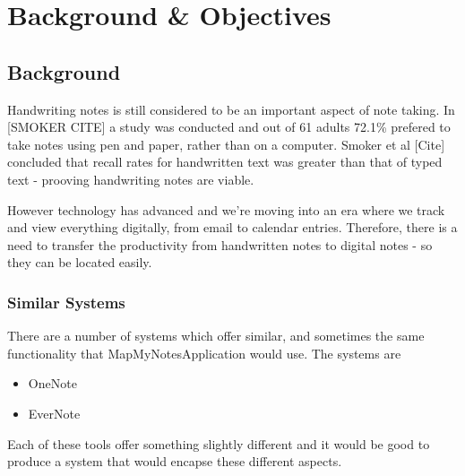 \chapter{Background \& Objectives}






\section{Background}
Handwriting notes is still considered to be an important aspect of note taking. In [SMOKER CITE] a study was conducted and out of 61 adults 72.1\% prefered to take notes using pen and paper, rather than on a computer. Smoker et al [Cite]  concluded that recall rates for handwritten text was greater than that of typed text - prooving handwriting notes are viable.

However technology has advanced and we're moving into an era where we track and view everything digitally, from email to calendar entries. Therefore, there is a need to transfer the productivity from handwritten notes to digital notes - so they can be located easily.



\subsection{Similar Systems}
There are a number of systems which offer similar, and sometimes the same functionality that MapMyNotesApplication would use. The systems are
\begin{itemize}
  \item OneNote
  \item EverNote
\end{itemize}
Each of these tools offer something slightly different and it would be good to produce a system that would encapse these different aspects.
